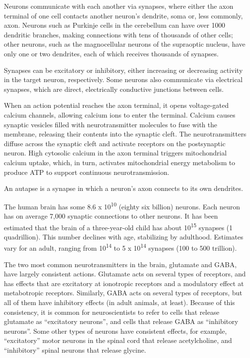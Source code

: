 \documentclass[]{book}
\begin{document}
Neurons communicate with each another via synapses, where either the axon terminal of one cell contacts another neuron's dendrite, soma or, less commonly, axon. Neurons such as Purkinje cells in the cerebellum can have over 1000 dendritic branches, making connections with tens of thousands of other cells; other neurons, such as the magnocellular neurons of the supraoptic nucleus, have only one or two dendrites, each of which receives thousands of synapses.

Synapses can be excitatory or inhibitory, either increasing or decreasing activity in the target neuron, respectively. Some neurons also communicate via electrical synapses, which are direct, electrically conductive junctions between cells.

When an action potential reaches the axon terminal, it opens voltage-gated calcium channels, allowing calcium ions to enter the terminal. Calcium causes synaptic vesicles filled with neurotransmitter molecules to fuse with the membrane, releasing their contents into the synaptic cleft. The neurotransmitters diffuse across the synaptic cleft and activate receptors on the postsynaptic neuron. High cytosolic calcium in the axon terminal triggers mitochondrial calcium uptake, which, in turn, activates mitochondrial energy metabolism to produce ATP to support continuous neurotransmission.

An autapse is a synapse in which a neuron's axon connects to its own dendrites.

The human brain has some 8.6 x 10\textsuperscript{10} (eighty six billion) neurons. Each neuron has on average 7,000 synaptic connections to other neurons. It has been estimated that the brain of a three-year-old child has about 10\textsuperscript{15} synapses (1 quadrillion). This number declines with age, stabilizing by adulthood. Estimates vary for an adult, ranging from 10\textsuperscript{14} to 5 x 10\textsuperscript{14} synapses (100 to 500 trillion).

The two most common neurotransmitters in the brain, glutamate and GABA, have largely consistent actions. Glutamate acts on several types of receptors, and has effects that are excitatory at ionotropic receptors and a modulatory effect at metabotropic receptors. Similarly, GABA acts on several types of receptors, but all of them have inhibitory effects (in adult animals, at least). Because of this consistency, it is common for neuroscientists to refer to cells that release glutamate as ``excitatory neurons'', and cells that release GABA as ``inhibitory neurons''. Some other types of neurons have consistent effects, for example, ``excitatory'' motor neurons in the spinal cord that release acetylcholine, and ``inhibitory'' spinal neurons that release glycine.
\end{document}
